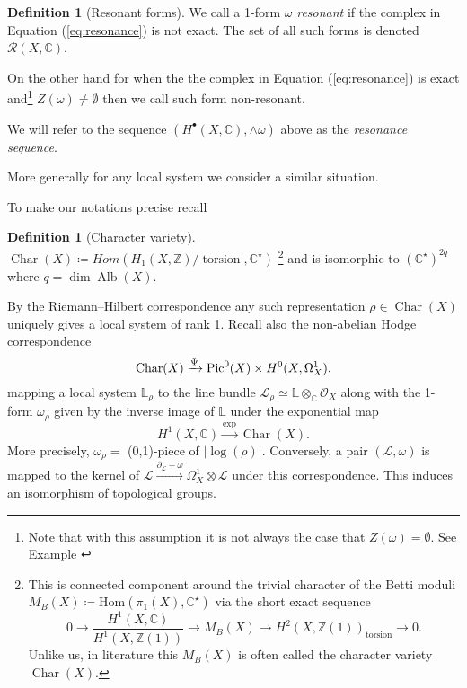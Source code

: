 \documentclass[12pt,reqno]{amsart}
\theoremstyle{question}
\theoremstyle{definition}
\newtheorem{definition}[theorem]{Definition}
\theoremstyle{remark}
\theoremstyle{cited}
\theoremstyle{citeddef}
\newcommand{\C}{\mathbb{C}}
\newcommand{\Hom}{\mathrm{Hom}}
\DeclareMathOperator{\Alb}{Alb}
\DeclareMathOperator{\Char}{Char}
\def\Pic{{\rm Pic}}
\newcommand{\sL}{\mathcal{L}}
\newcommand{\sO}{\mathcal{O}}
\newcommand{\sR}{\mathcal{R}}
\newcommand{\bbC}{\mathbb{C}}
\newcommand{\bbL}{\mathbb{L}}
\newcommand{\bbZ}{\mathbb{Z}}
\DeclareMathOperator{\torsion}{torsion}
\begin{document}
\begin{definition}[Resonant forms]\label{def:resonance}
We call a 1-form $\omega$ \emph{resonant} if the complex 
in Equation (\ref{eq:resonance}) is not exact. The set of all such forms 
is denoted $\sR(X,\bbC)$.

On the other hand for when the the complex 
in Equation (\ref{eq:resonance}) is exact and\footnote{Note that
with this assumption it is not always the case that $Z(\omega) = \emptyset$. See Example \cite{DJL17}}
$Z(\omega) \neq \emptyset$ then we call such form non-resonant. 


We will refer to the sequence $(H^{\bullet}(X,\bbC), \wedge\omega)$ above as the \emph{resonance sequence}.
\end{definition}




More generally for any local system we consider a similar situation. 



To make our notations precise recall 
\begin{definition}[Character variety]
$\Char(X) \coloneqq Hom(H_1(X, \bbZ)/\torsion, \bbC^{\star})$
\footnote{This is connected component around the trivial character of the Betti moduli $M_B(X) \coloneqq \Hom(\pi_1(X), \bbC^{\star})$ via the short exact sequence \[0\to \frac{H^1(X, \bbC)}{H^1(X, \bbZ(1))}\to M_B(X)\to H^2(X, \bbZ(1))_{\torsion}\to 0.\] Unlike us, in literature this $M_B(X)$ is often called the character variety $\Char(X)$.} and is isomorphic to
$(\bbC^{\star})^{2q}$ where $q = \dim \Alb(X)$.
\end{definition}
By the Riemann--Hilbert correspondence any such representation $\rho\in \Char(X)$ 
uniquely gives a local system of rank 1. 
Recall also the non-abelian Hodge
correspondence
\[\Char(X) \xrightarrow{\Psi} \Pic^{0}(X)\times H^0(X,\Omega_X^1).\]
mapping a local system $\bbL_{\rho}$ to the line bundle $\sL_{\rho}\simeq \bbL\otimes_{\bbC}\sO_X$
along with the 1-form $\omega_{\rho}$ given by the inverse image of $\bbL$ under
the exponential map
\begin{equation}
H^1(X,\bbC) \xrightarrow{\exp} \Char(X).
\label{eq:exponential}
\end{equation}
More precisely, $\omega_{\rho} = $ (0,1)-piece of $|\log(\rho)|$. Conversely, a pair $(\sL, \omega)$ 
is mapped to the kernel of $\sL\xrightarrow{\partial_{\sL}+\omega} \Omega_X^1\otimes \sL$ under this correspondence.
This induces an isomorphism of topological groups. 
\end{document}
